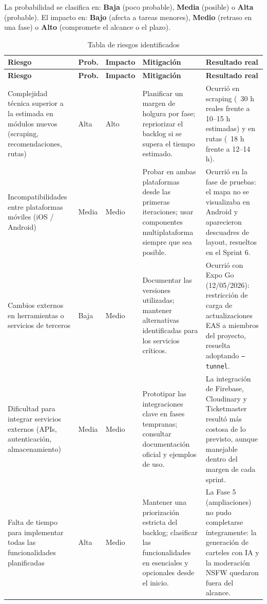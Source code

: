 La probabilidad se clasifica en: \textbf{Baja} (poco probable), \textbf{Media} (posible) o \textbf{Alta} (probable). El impacto en: \textbf{Bajo} (afecta a tareas menores), \textbf{Medio} (retraso en una fase) o \textbf{Alto} (compromete el alcance o el plazo).

\begin{longtable}{p{3.5cm}p{1.5cm}p{1.5cm}p{4.5cm}p{3.5cm}}
\caption{Tabla de riesgos identificados}\label{tab:riesgos}\\
\toprule
\textbf{Riesgo} & \textbf{Prob.} & \textbf{Impacto} & \textbf{Mitigación} & \textbf{Resultado real} \\
\midrule
\endfirsthead
\toprule
\textbf{Riesgo} & \textbf{Prob.} & \textbf{Impacto} & \textbf{Mitigación} & \textbf{Resultado real} \\
\midrule
\endhead
\bottomrule
\endlastfoot

Complejidad técnica superior a la estimada en módulos nuevos (scraping, recomendaciones, rutas) &
Alta & Alto &
Planificar un margen de holgura por fase; repriorizar el backlog si se supera el tiempo estimado. &
Ocurrió en scraping (~30 h reales frente a 10--15 h estimadas) y en rutas (~18 h frente a 12--14 h). \\
\midrule

Incompatibilidades entre plataformas móviles (iOS / Android) &
Media & Medio &
Probar en ambas plataformas desde las primeras iteraciones; usar componentes multiplataforma siempre que sea posible. &
Ocurrió en la fase de pruebas: el mapa no se visualizaba en Android y aparecieron descuadres de layout, resueltos en el Sprint 6. \\
\midrule

Cambios externos en herramientas o servicios de terceros &
Baja & Medio &
Documentar las versiones utilizadas; mantener alternativas identificadas para los servicios críticos. &
Ocurrió con Expo Go (12/05/2026): restricción de carga de actualizaciones EAS a miembros del proyecto, resuelta adoptando \texttt{--tunnel}. \\
\midrule

Dificultad para integrar servicios externos (APIs, autenticación, almacenamiento) &
Media & Medio &
Prototipar las integraciones clave en fases tempranas; consultar documentación oficial y ejemplos de uso. &
La integración de Firebase, Cloudinary y Ticketmaster resultó más costosa de lo previsto, aunque manejable dentro del margen de cada sprint. \\
\midrule

Falta de tiempo para implementar todas las funcionalidades planificadas &
Alta & Medio &
Mantener una priorización estricta del backlog; clasificar las funcionalidades en esenciales y opcionales desde el inicio. &
La Fase 5 (ampliaciones) no pudo completarse íntegramente: la generación de carteles con IA y la moderación NSFW quedaron fuera del alcance. \\
\midrule


\end{longtable}
